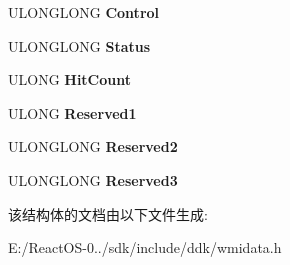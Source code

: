 \begin{DoxyCompactItemize}
U\+L\+O\+N\+G\+L\+O\+NG {\bfseries Control}
\item 
\mbox{\label{struct___kernel_perf_state_af8e5e4ca07fccbdfcceeedbe40c4cd30}} 
U\+L\+O\+N\+G\+L\+O\+NG {\bfseries Status}
\item 
\mbox{\label{struct___kernel_perf_state_a97ceb55710bfb9a9ce12b90021a238c5}} 
U\+L\+O\+NG {\bfseries Hit\+Count}
\item 
\mbox{\label{struct___kernel_perf_state_ae1dc8f4d76a5c229a07ed5c64d510c34}} 
U\+L\+O\+NG {\bfseries Reserved1}
\item 
\mbox{\label{struct___kernel_perf_state_ae2a279d85dbc4d5d9fcc4091a931a8ed}} 
U\+L\+O\+N\+G\+L\+O\+NG {\bfseries Reserved2}
\item 
\mbox{\label{struct___kernel_perf_state_ad101e059793d27e4c1285e7697937247}} 
U\+L\+O\+N\+G\+L\+O\+NG {\bfseries Reserved3}
\end{DoxyCompactItemize}


该结构体的文档由以下文件生成\+:\begin{DoxyCompactItemize}
\item 
E\+:/\+React\+O\+S-\/0../sdk/include/ddk/wmidata.\+h\end{DoxyCompactItemize}
